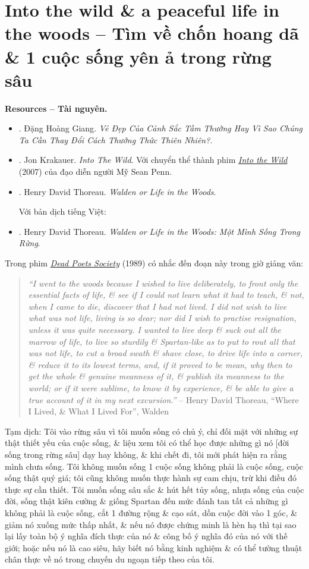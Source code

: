 \documentclass[12pt,oneside]{book}
\begin{document}
\section{Into the wild \& a peaceful life in the woods -- Tìm về chốn hoang dã \& 1 cuộc sống yên ả trong rừng sâu}
{\bf \textsf{Resources -- Tài nguyên.}}
\begin{itemize}
	\item \cite{Giang_nature}. {\sc Đặng Hoàng Giang}. {\it Vẻ Đẹp Của Cảnh Sắc Tầm Thường Hay Vì Sao Chúng Ta Cần Thay Đổi Cách Thưởng Thức Thiên Nhiên?}.
	\item \cite{Krakauer_wild}. {\sc Jon Krakauer}. {\it Into The Wild}. Với chuyển thể thành phim \href{https://www.imdb.com/title/tt0758758}{\it Into the Wild} (2007) của đạo diễn người Mỹ {\sc Sean Penn}.
	\item \cite{Thoreau_Walden}. {\sc Henry David Thoreau}. {\it Walden or Life in the Woods}.
	
	Với bản dịch tiếng Việt:
	\item \cite{Thoreau_Walden_VN}. {\sc Henry David Thoreau}. {\it Walden or Life in the Woods: Một Mình Sống Trong Rừng}.
\end{itemize}
Trong phim \href{https://www.imdb.com/title/tt0097165}{\it Dead Poets Society} (1989) có nhắc đến đoạn này trong giờ giảng văn:
\begin{quotation}
	{\it``I went to the woods because I wished to live deliberately, to front only the essential facts of life, \& see if I could not learn what it had to teach, \& not, when I came to die, discover that I had not lived. I did not wish to live what was not life, living is so dear; nor did I wish to practise resignation, unless it was quite necessary. I wanted to live deep \& suck out all the marrow of life, to live so sturdily \& Spartan-like as to put to rout all that was not life, to cut a broad swath \& shave close, to drive life into a corner, \& reduce it to its lowest terms, and, if it proved to be mean, why then to get the whole \& genuine meanness of it, \& publish its meanness to the world; or if it were sublime, to know it by experience, \& be able to give a true account of it in my next excursion.''} -- {\sc Henry David Thoreau}, ``Where I Lived, \& What I Lived For'', Walden \cite{Thoreau_Walden}
\end{quotation}
{\sf Tạm dịch}: Tôi vào rừng sâu vì tôi muốn sống có chủ ý, chỉ đối mặt với những sự thật thiết yếu của cuộc sống, \& liệu xem tôi có thể học được những gì nó [đời sống trong rừng sâu] dạy hay không, \& khi chết đi, tôi mới phát hiện ra rằng mình chưa sống. Tôi không muốn sống 1 cuộc sống không phải là cuộc sống, cuộc sống thật quý giá; tôi cũng không muốn thực hành sự cam chịu, trừ khi điều đó thực sự cần thiết. Tôi muốn sống sâu sắc \& hút hết tủy sống, nhựa sống của cuộc đời, sống thật kiên cường \& giống Spartan đến mức đánh tan tất cả những gì không phải là cuộc sống, cắt 1 đường rộng \& cạo sát, dồn cuộc đời vào 1 góc, \& giảm nó xuống mức thấp nhất, \& nếu nó được chứng minh là hèn hạ thì tại sao lại lấy toàn bộ ý nghĩa đích thực của nó \& công bố ý nghĩa đó của nó với thế giới; hoặc nếu nó là cao siêu, hãy biết nó bằng kinh nghiệm \& có thể tường thuật chân thực về nó trong chuyến du ngoạn tiếp theo của tôi.
\end{document}
